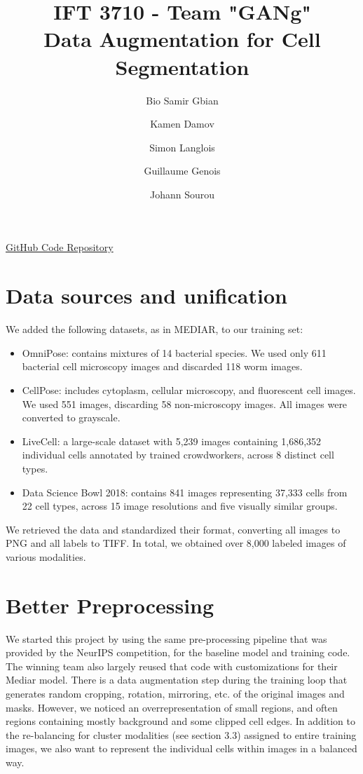 \documentclass[]{article}
\title{\textbf{IFT 3710 - Team "GANg"} \\ 
\textbf{Data Augmentation for Cell Segmentation}}
\author[1]{Bio Samir Gbian}
\author[1]{Kamen Damov}
\author[1]{Simon Langlois}
\author[1]{Guillaume Genois}
\author[1]{Johann Sourou}
\affil{Departement of Computer Science and Operations Research}
\affil[1]{University of Montreal}
\begin{document}
\maketitle

\href{https://github.com/KamenDamov/IFT3710-Advanced-Project-in-ML-AI}{GitHub Code Repository}

\section{Data sources and unification}
We added the following datasets, as in MEDIAR, to our training set:

\begin{itemize}
    \item OmniPose: contains mixtures of 14 bacterial species. We used only 611 bacterial cell microscopy images and discarded 118 worm images.
    \item CellPose: includes cytoplasm, cellular microscopy, and fluorescent cell images. We used 551 images, discarding 58 non-microscopy images. All images were converted to grayscale.
    \item LiveCell: a large-scale dataset with 5,239 images containing 1,686,352 individual cells annotated by trained crowdworkers, across 8 distinct cell types.
    \item Data Science Bowl 2018: contains 841 images representing 37,333 cells from 22 cell types, across 15 image resolutions and five visually similar groups.
\end{itemize}

We retrieved the data and standardized their format, converting all images to PNG and all labels to TIFF. In total, we obtained over 8,000 labeled images of various modalities.

\section{Better Preprocessing}
We started this project by using the same pre-processing pipeline that was provided by the NeurIPS competition, for the baseline model and training code. The winning team also largely reused that code with customizations for their Mediar model. There is a data augmentation step during the training loop that generates random cropping, rotation, mirroring, etc. of the original images and masks. However, we noticed an overrepresentation of small regions, and often regions containing mostly background and some clipped cell edges. In addition to the re-balancing for cluster modalities (see section 3.3) assigned to entire training images, we also want to represent the individual cells within images in a balanced way.
\end{document}
